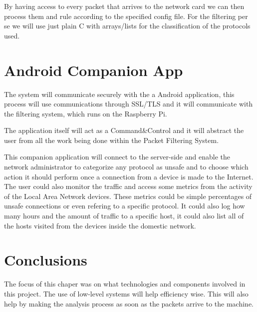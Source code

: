 By having access to every packet that arrives to the network card we can then
process them and rule according to the specified config file. For the filtering
per se we will use just plain C with arrays/lists  for the classification of
the protocols used.

\section{Android Companion App}
\label{chap3:sec:aca}
The system will communicate securely with the a Android application, this
process will use communications through SSL/TLS and it will communicate with
the filtering system, which runs on the Raspberry Pi.

The application itself will act as a Command\&Control and it will abstract the
user from all the work being done within the Packet Filtering System.

This companion application will connect to the server-side and enable the
network administrator to categorize any protocol as unsafe and to choose which
action it should perform once a connection from a device is made to the
Internet. The user could also monitor the traffic and access some metrics from
the activity of the Local Area Network devices. These metrics could be simple
percentages of unsafe connections or even refering to a specific protocol. It
could also log how many hours and the amount of traffic to a specific host, it
could also list all of the hosts visited from the devices inside the domestic
network.


\section{Conclusions}
\label{chap3:sec:concs}
The focus of this chaper was on what technologies and components involved in
this project.
The use of low-level systems will help efficiency wise. This will also help by
making the analysis process as soon as the packets arrive to the machine.
